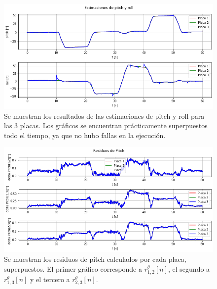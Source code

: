 \begin{figure}[H]
    \centering
    \includegraphics[width=\textwidth]{img/resultados_pitch_roll_saltos_aleatorios.png}
    \caption{Se muestran los resultados de las estimaciones de pitch y roll para las 3 placas. Los gráficos se encuentran prácticamente superpuestos todo el tiempo, ya que no hubo fallas en la ejecución.}
    \label{fig:resultados_pitch_roll_saltos_aleatorios}
\end{figure}

\begin{figure}[H]
    \centering
    \includegraphics[width=\textwidth]{img/resultados_residuos_pitch_saltos_aleatorios.png}
    \caption{Se muestran los residuos de pitch calculados por cada placa, superpuestos. El primer gráfico corresponde a $r_{1,2}^{\theta}[n]$, el segundo a $r_{1,3}^{\theta}[n]$ y el tercero a $r_{2,3}^{\theta}[n]$.}
    \label{fig:resultados_residuos_pitch_saltos_aleatorios}
\end{figure}

